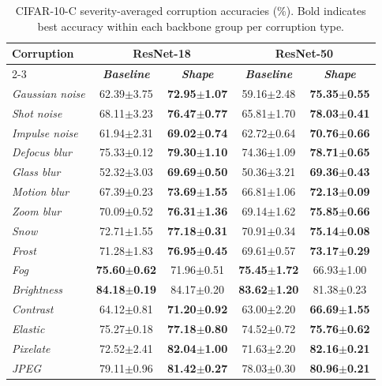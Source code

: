 \begin{table}[htbp]
\caption{CIFAR-10-C severity-averaged corruption accuracies (\%). Bold indicates best accuracy within each backbone group per corruption type.}
\begin{center}
\begin{tabular}{|l|c|c|c|c|}
\hline
\textbf{Corruption} & \multicolumn{2}{c|}{ResNet-18} & \multicolumn{2}{c|}{ResNet-50} \\
\cline{2-3} \cline{4-5}
 & \textbf{\textit{Baseline}} & \textbf{\textit{Shape}} & \textbf{\textit{Baseline}} & \textbf{\textit{Shape}} \\
\hline
\textit{Gaussian noise} & 62.39$\pm$3.75 & \textbf{72.95$\pm$1.07} & 59.16$\pm$2.48 & \textbf{75.35$\pm$0.55} \\
\textit{Shot noise} & 68.11$\pm$3.23 & \textbf{76.47$\pm$0.77} & 65.81$\pm$1.70 & \textbf{78.03$\pm$0.41} \\
\textit{Impulse noise} & 61.94$\pm$2.31 & \textbf{69.02$\pm$0.74} & 62.72$\pm$0.64 & \textbf{70.76$\pm$0.66} \\
\textit{Defocus blur} & 75.33$\pm$0.12 & \textbf{79.30$\pm$1.10} & 74.36$\pm$1.09 & \textbf{78.71$\pm$0.65} \\
\textit{Glass blur} & 52.32$\pm$3.03 & \textbf{69.69$\pm$0.50} & 50.36$\pm$3.21 & \textbf{69.36$\pm$0.43} \\
\textit{Motion blur} & 67.39$\pm$0.23 & \textbf{73.69$\pm$1.55} & 66.81$\pm$1.06 & \textbf{72.13$\pm$0.09} \\
\textit{Zoom blur} & 70.09$\pm$0.52 & \textbf{76.31$\pm$1.36} & 69.14$\pm$1.62 & \textbf{75.85$\pm$0.66} \\
\textit{Snow} & 72.71$\pm$1.55 & \textbf{77.18$\pm$0.31} & 70.91$\pm$0.34 & \textbf{75.14$\pm$0.08} \\
\textit{Frost} & 71.28$\pm$1.83 & \textbf{76.95$\pm$0.45} & 69.61$\pm$0.57 & \textbf{73.17$\pm$0.29} \\
\textit{Fog} & \textbf{75.60$\pm$0.62} & 71.96$\pm$0.51 & \textbf{75.45$\pm$1.72} & 66.93$\pm$1.00 \\
\textit{Brightness} & \textbf{84.18$\pm$0.19} & 84.17$\pm$0.20 & \textbf{83.62$\pm$1.20} & 81.38$\pm$0.23 \\
\textit{Contrast} & 64.12$\pm$0.81 & \textbf{71.20$\pm$0.92} & 63.00$\pm$2.20 & \textbf{66.69$\pm$1.55} \\
\textit{Elastic} & 75.27$\pm$0.18 & \textbf{77.18$\pm$0.80} & 74.52$\pm$0.72 & \textbf{75.76$\pm$0.62} \\
\textit{Pixelate} & 72.52$\pm$2.41 & \textbf{82.04$\pm$1.00} & 71.63$\pm$2.20 & \textbf{82.16$\pm$0.21} \\
\textit{JPEG} & 79.11$\pm$0.96 & \textbf{81.42$\pm$0.27} & 78.03$\pm$0.30 & \textbf{80.96$\pm$0.21} \\
\hline
\end{tabular}
\label{tab:cifar10_corruptions}
\end{center}
\end{table}